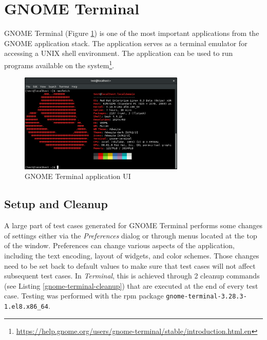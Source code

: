 
\section{GNOME Terminal}\label{terminal}
GNOME Terminal (Figure \ref{terminal-gui}) is one of the most important applications from the GNOME application stack. The application serves as a terminal emulator for accessing a UNIX shell environment. The application can be used to run programs available on the system\footnote{\url{https://help.gnome.org/users/gnome-terminal/stable/introduction.html.en}}. 

\begin{figure}[H]
	\centering
	\includegraphics[width=0.7\textwidth,clip]{obrazky-figures/gnome-terminal-ui.png}
	\caption{GNOME Terminal application UI}
	\label{terminal-gui}
\end{figure}

\subsection*{Setup and Cleanup}
A large part of test cases generated for GNOME Terminal performs some changes of settings either via the \textit{Preferences} dialog or through menus located at the top of the window. Preferences can change various aspects of the application, including the text encoding, layout of widgets, and color schemes. Those changes need to be set back to default values to make sure that test cases will not affect subsequent test cases. In \textit{Terminal}, this is achieved through 2 cleanup commands (see Listing \ref{gnome-terminal-cleanup}) that are executed at the end of every test case. Testing was performed with the rpm package \texttt{gnome-terminal-3.28.3-1.el8.x86\_64}.

